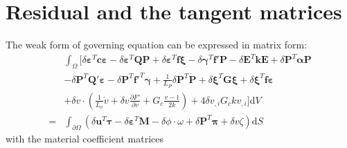 \section{Residual and the tangent matrices}
The weak form of governing equation can be expressed in matrix form:
\begin{equation}\label{eq23}
    \begin{split}
        &\int_\Omega\bigg[ \delta\mathbf{\varepsilon}^T\mathbf{c}\mathbf{\varepsilon}-\delta\mathbf{\varepsilon}^T\mathbf{Q}\mathbf{P}+\delta\mathbf{\varepsilon}^T\mathbf{f}\mathbf{\xi}-\delta\mathbf{\gamma}^T\mathbf{f'}\mathbf{P}-\delta\mathbf{E}^T\mathbf{k}\mathbf{E}+\delta\mathbf{P}^T\mathbf{\alpha}\mathbf{P}\\
        &-\delta\mathbf{P}^T\mathbf{Q'}\mathbf{\varepsilon}-\delta\mathbf{P}^T{\mathbf{f}'}^T\mathbf{\gamma}+\frac{1}{L_P}\delta\mathbf{P}^T \mathbf{\dot{P}} +\delta\mathbf{\xi}^T\mathbf{G}\mathbf{\xi}+\delta\mathbf{\xi}^T\mathbf{f}\mathbf{\varepsilon}\\
        &+\delta v\cdot\left( \frac{1}{L_\nu} \dot{v}+ \delta v\frac{\partial F'}{\partial v}+G_c\frac{v-1}{2k} \right)+4\delta v_{,i}G_ckv_{,i} \bigg] \mathrm{d} V\\
        =&\int_{\partial \Omega} \left( \delta \mathbf{u}^T\mathbf{\tau}-\delta \mathbf{\varepsilon}^T\mathbf{M}-\delta \phi \cdot \omega + \delta\mathbf{P}^T\mathbf{\pi}+\delta v\zeta\right)\mathrm{d}S
    \end{split}
\end{equation}
with the material coefficient matrices
